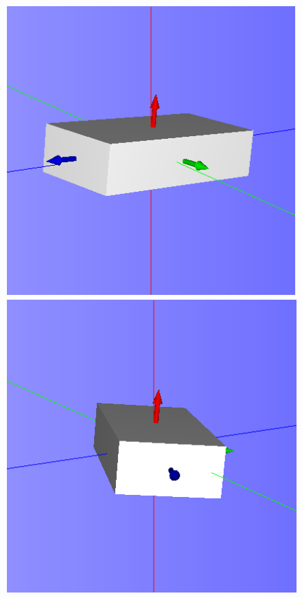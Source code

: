 \begin{figure}[ht]
	\centering
	\begin{minipage}[b]{0.3\linewidth}
		\centering
		\includegraphics[width=\textwidth]{images/drift1.png}
	\end{minipage}
	\hspace{0.5cm}
	\begin{minipage}[b]{0.3\linewidth}
		\centering
		\includegraphics[width=\textwidth]{images/drift2.png}

\end{minipage}
\end{figure}
